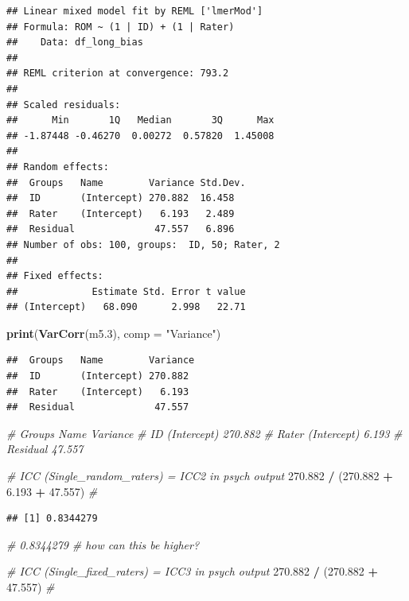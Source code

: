 \documentclass[
]{book}
\newenvironment{Shaded}{\begin{snugshade}}{\end{snugshade}}
\newcommand{\AttributeTok}[1]{\textcolor[rgb]{0.13,0.29,0.53}{#1}}
\newcommand{\CommentTok}[1]{\textcolor[rgb]{0.56,0.35,0.01}{\textit{#1}}}
\newcommand{\FloatTok}[1]{\textcolor[rgb]{0.00,0.00,0.81}{#1}}
\newcommand{\FunctionTok}[1]{\textcolor[rgb]{0.13,0.29,0.53}{\textbf{#1}}}
\newcommand{\NormalTok}[1]{#1}
\newcommand{\SpecialCharTok}[1]{\textcolor[rgb]{0.81,0.36,0.00}{\textbf{#1}}}
\newcommand{\StringTok}[1]{\textcolor[rgb]{0.31,0.60,0.02}{#1}}
\begin{document}
\begin{verbatim}
## Linear mixed model fit by REML ['lmerMod']
## Formula: ROM ~ (1 | ID) + (1 | Rater)
##    Data: df_long_bias
## 
## REML criterion at convergence: 793.2
## 
## Scaled residuals: 
##      Min       1Q   Median       3Q      Max 
## -1.87448 -0.46270  0.00272  0.57820  1.45008 
## 
## Random effects:
##  Groups   Name        Variance Std.Dev.
##  ID       (Intercept) 270.882  16.458  
##  Rater    (Intercept)   6.193   2.489  
##  Residual              47.557   6.896  
## Number of obs: 100, groups:  ID, 50; Rater, 2
## 
## Fixed effects:
##             Estimate Std. Error t value
## (Intercept)   68.090      2.998   22.71
\end{verbatim}

\begin{Shaded}
\begin{Highlighting}[]
\FunctionTok{print}\NormalTok{(}\FunctionTok{VarCorr}\NormalTok{(m5}\FloatTok{.3}\NormalTok{), }\AttributeTok{comp =} \StringTok{"Variance"}\NormalTok{)}
\end{Highlighting}
\end{Shaded}

\begin{verbatim}
##  Groups   Name        Variance
##  ID       (Intercept) 270.882 
##  Rater    (Intercept)   6.193 
##  Residual              47.557
\end{verbatim}

\begin{Shaded}
\begin{Highlighting}[]
\CommentTok{\# Groups   Name        Variance}
\CommentTok{\# ID       (Intercept) 270.882 }
\CommentTok{\# Rater    (Intercept)   6.193 }
\CommentTok{\# Residual              47.557 }


\CommentTok{\# ICC (Single\_random\_raters) = ICC2 in psych output}
\FloatTok{270.882} \SpecialCharTok{/}\NormalTok{ (}\FloatTok{270.882} \SpecialCharTok{+} \FloatTok{6.193} \SpecialCharTok{+} \FloatTok{47.557}\NormalTok{) }\CommentTok{\# }
\end{Highlighting}
\end{Shaded}

\begin{verbatim}
## [1] 0.8344279
\end{verbatim}

\begin{Shaded}
\begin{Highlighting}[]
\CommentTok{\# 0.8344279}
\CommentTok{\# how can this be higher?}

\CommentTok{\# ICC (Single\_fixed\_raters) = ICC3 in psych output}
\FloatTok{270.882} \SpecialCharTok{/}\NormalTok{ (}\FloatTok{270.882} \SpecialCharTok{+} \FloatTok{47.557}\NormalTok{) }\CommentTok{\#}
\end{Highlighting}
\end{Shaded}
\end{document}
